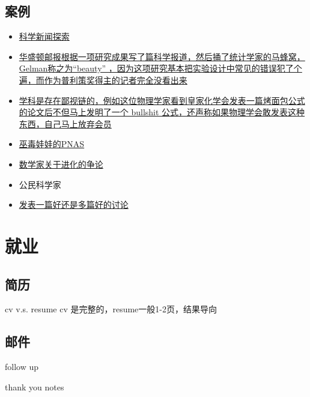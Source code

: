 \documentclass[]{tufte-book}
\begin{document}
\hypertarget{ux6848ux4f8b}{%
\section{案例}\label{ux6848ux4f8b}}

\begin{itemize}
\item
  \href{http://www.statschat.org.nz/2017/02/04/tracing-a-science-story/}{科学新闻探索}
\item
  \href{http://andrewgelman.com/2017/09/19/2010s-never-happened/}{华盛顿邮报根据一项研究成果写了篇科学报道，然后捅了统计学家的马蜂窝，Gelman称之为``beauty'' ，因为这项研究基本把实验设计中常见的错误犯了个遍，而作为普利策奖得主的记者完全没看出来}
\item
  \href{http://wordpress.mrreid.org/2013/08/20/the-equation-for-the-perfect-equation/}{学科是存在鄙视链的，例如这位物理学家看到皇家化学会发表一篇烤面包公式的论文后不但马上发明了一个 bullshit 公式，还声称如果物理学会敢发表这种东西，自己马上放弃会员}
\item
  \href{http://andrewgelman.com/2018/04/01/april-fools-post-dead-serious/}{巫毒娃娃的PNAS}
\item
  \href{https://liorpachter.wordpress.com/2018/09/17/mathematics-matters/}{数学家关于进化的争论}
\item
  公民科学家
\item
  \href{https://deevybee.blogspot.com/2018/07/one-big-study-or-two-small-studies.html}{发表一篇好还是多篇好的讨论}
\end{itemize}

\hypertarget{career}{%
\chapter{就业}\label{career}}

\hypertarget{ux7b80ux5386}{%
\section{简历}\label{ux7b80ux5386}}

cv v.s. resume
cv 是完整的，resume一般1-2页，结果导向

\hypertarget{ux90aeux4ef6}{%
\section{邮件}\label{ux90aeux4ef6}}

follow up

thank you notes
\end{document}
